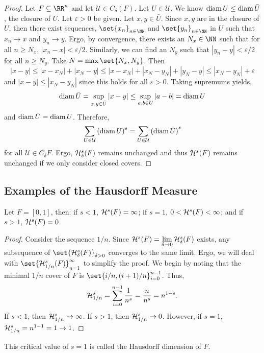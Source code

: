 \begin{proof}
	Let $F\subseteq\RR^n$ and let $\mathcal{U}\in C_\delta(F)$.
	Let $U\in\mathcal{U}$.
	We know $\operatorname{diam} U\leq\operatorname{diam} \bar{U}$, the closure of $U$.
	Let $\varepsilon > 0$ be given.
	Let $x,y\in\bar{U}$.
	Since $x,y$ are in the closure of $U$, then there exist sequences, $\set{x_n}_{n\in\NN}$ and $\set{y_n}_{n\in\NN}$ in $U$ such that $x_n\rightarrow x$ and $y_n\rightarrow y$.
	Ergo, by convergence, there exists an $N_x\in\NN$ such that for all $n\geq N_x$, $|x_n-x|<\varepsilon/2$.
	Similarly, we can find an $N_y$ such that $|y_n-y|<\varepsilon/2$ for all $n\geq N_y$.
	Take $N=\max\set{N_x,N_y}$.
	Then
	\[
		|x-y|\leq |x-x_N|+|x_N-y|\leq |x-x_N|+|x_N-y_N|+|y_N-y|\leq |x_N-y_N|+\varepsilon
	\]
	and $|x-y|\leq |x_N-y_N|$ since this holds for all $\varepsilon >0$.
	Taking supremums yields,
	\[
		\operatorname{diam} \bar{U} =\sup_{x,y\in\bar{U}} |x-y|\leq \sup_{a,b\in U} |a-b|=\operatorname{diam} U
	\]
	and $\operatorname{diam}\bar{U}=\operatorname{diam} U$.
	Therefore,
	\[
		\sum_{U\in\mathcal{U}}{(\operatorname{diam} U)}^s=\sum_{U\in\mathcal{U}}{(\operatorname{diam}\bar{U})}^s
	\]
	for all $\mathcal{U}\in C_\delta F$.
	Ergo, $\mathcal{H}^s_\delta(F)$ remains unchanged and thus $\mathcal{H}^s(F)$ remains unchanged if we only consider closed covers.
\end{proof}

\subsection{Examples of the Hausdorff Measure}

\begin{example}
	Let $F=[0,1]$, then: if $s < 1$, $\mathcal{H}^s(F)=\infty$; if $s=1$, $0 <\mathcal{H}^s(F) <\infty$; and if $s>1$, $\mathcal{H}^s(F)=0$.
\end{example}
\begin{proof}
	Consider the sequence $1/n$.
	Since $\mathcal{H}^s(F)=\lim\limits_{\delta\rightarrow0}\mathcal{H}^s_\delta(F)$ exists,
	any subsequence of $\set{\hm^s_\delta(F)}_{\delta>0}$ converges to the same limit.
	Ergo, we will deal with $\set{\hm^s_{1/n}(F)}_{n=1}^\infty$ to simplify the proof.
	We begin by noting that the minimal $1/n$ cover of $F$ is $\set{i/n,(i+1)/n}_{i=0}^{n-1}$.
	Thus,
	\[
		\mathcal{H}^s_{1/n}=\sum_{i=0}^{n-1}\frac{1}{n^s}=\frac{n}{n^s}=n^{1-s}.
	\]
	If $s < 1$, then $\mathcal{H}^s_{1/n}\rightarrow\infty$.
	If $s > 1$, then $\mathcal{H}^s_{1/n}\rightarrow 0$.
	However, if $s=1$, $\mathcal{H}^s_{1/n}=n^{1-1}=1\rightarrow 1$.
\end{proof}

This critical value of $s=1$ is called the Hausdorff dimension of $F$.

